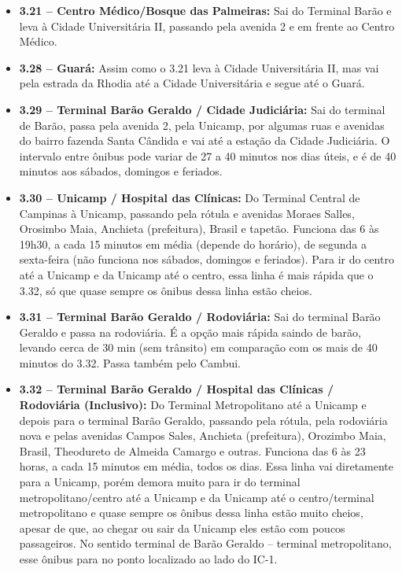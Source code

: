 \begin{itemize}
    \item  \textbf{3.21 -- Centro Médico/Bosque das Palmeiras:} Sai do Terminal
        Barão e leva à Cidade Universitária II, passando pela avenida 2 e em
        frente ao Centro Médico.

    \item  \textbf{3.28 -- Guará:} Assim como o 3.21 leva à Cidade Universitária
        II, mas vai pela estrada da Rhodia até a Cidade Universitária e segue
        até o Guará.

    \item  \textbf{3.29 -- Terminal Barão Geraldo / Cidade Judiciária:} Sai do
        terminal de Barão, passa pela avenida 2, pela Unicamp, por algumas ruas
        e avenidas do bairro fazenda Santa Cândida e vai até a estação da Cidade
        Judiciária. O intervalo entre ônibus pode variar de 27 a 40 minutos nos
        dias úteis, e é de 40 minutos aos sábados, domingos e feriados.

    \item  \textbf{3.30 -- Unicamp / Hospital das Clínicas:} Do Terminal Central
        de Campinas à Unicamp, passando pela rótula e avenidas Moraes Salles,
        Orosimbo Maia, Anchieta (prefeitura), Brasil e tapetão. Funciona das 6
        às 19h30, a cada 15 minutos em média (depende do horário), de segunda a
        sexta-feira (não funciona nos sábados, domingos e feriados). Para ir do
        centro até a Unicamp e da Unicamp até o centro, essa linha é mais rápida
        que o 3.32, só que quase sempre os ônibus dessa linha estão cheios.

    \item  \textbf{3.31 -- Terminal Barão Geraldo / Rodoviária:} Sai do terminal
        Barão Geraldo e passa na rodoviária. É a opção mais rápida saindo de
        barão, levando cerca de 30 min (sem trânsito) em comparação com os mais
        de 40 minutos do 3.32. Passa também pelo Cambui.

    \item  \textbf{3.32 -- Terminal Barão Geraldo / Hospital das Clínicas /
        Rodoviária (Inclusivo):} Do Terminal Metropolitano até a Unicamp e
        depois para o terminal Barão Geraldo, passando pela rótula, pela
        rodoviária nova e pelas avenidas Campos Sales, Anchieta (prefeitura),
        Orozimbo Maia, Brasil, Theodureto de Almeida Camargo e outras. Funciona
        das 6 às 23 horas, a cada 15 minutos em média, todos os dias. Essa linha
        vai diretamente para a Unicamp, porém demora muito para ir do terminal
        metropolitano/centro até a Unicamp e da Unicamp até o centro/terminal
        metropolitano e quase sempre os ônibus dessa linha estão muito cheios,
        apesar de que, ao chegar ou sair da Unicamp eles estão com poucos
        passageiros. No sentido terminal de Barão Geraldo -- terminal
        metropolitano, esse ônibus para no ponto localizado ao lado do IC-1.


\end{itemize}
